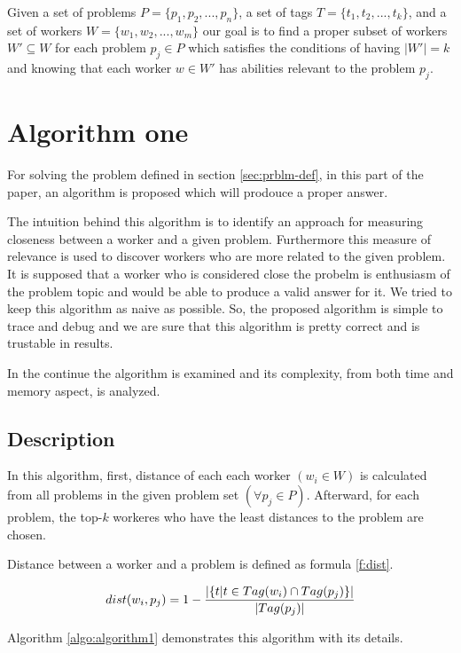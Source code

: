 \documentclass{template}
\begin{document}
Given a set of problems \(P = \{ p_1, p_2, ..., p_n \} \), a set of tags
\(T = \{ t_1, t_2, ..., t_k\} \),
and a set of workers \(W = \{w_1, w_2, ..., w_m \} \) our goal is to 
find a proper subset of workers \(W'  \subseteq W\) for each
problem \( p_j \in P \) which satisfies the conditions of having \(|W'| = k \) and knowing that 
each worker \(w \in W'\) has abilities relevant to the problem \(p_j\).

\section{Algorithm one}
\label{sec:algo-one}
For solving the problem defined in section \ref{sec:prblm-def}, in this part of the paper,
an algorithm is proposed which will prodouce a proper answer. 

The intuition behind this algorithm is to identify an approach for measuring closeness between 
a worker and a given problem. Furthermore this measure of relevance is used to discover workers
who are more related to the given problem. It is supposed that a worker who is considered close
the probelm is enthusiasm of the problem topic and would be able to produce a valid answer for it.
We tried to keep this algorithm as naive as possible. So, the proposed algorithm is simple to trace 
and debug and we are sure that this algorithm is pretty correct and is trustable in results. 

In the continue the algorithm is
examined and its complexity, from both time and memory aspect, is analyzed.

\subsection{Description}
In this algorithm, first, distance of each each worker \((w_i \in W)\) is calculated
from all problems in the given problem set \((\forall p_j \in P)\). Afterward, for each
problem, the top-\(k\) workeres who have the least distances to the problem are chosen. 

Distance between a worker and a problem is defined as formula \ref{f:dist}.

\begin{equation}
 dist(w_i, p_j) = 1 - {{|\{t | t \in Tag(w_i) \cap Tag(p_j)\}| \over {|Tag(p_j)|}}}
 \label{f:dist}
\end{equation}

Algorithm \ref{algo:algorithm1} demonstrates this algorithm with its details.
\end{document}
